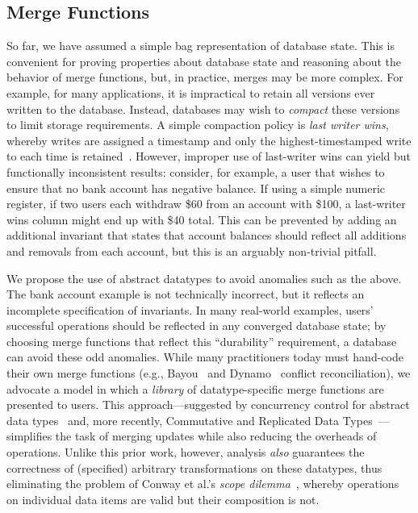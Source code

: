 \subsection{Merge Functions}
\label{sec:merge}

So far, we have assumed a simple bag representation of database
state. This is convenient for proving properties about database state
and reasoning about the behavior of merge functions, but, in practice,
merges may be more complex. For example, for many applications, it is
impractical to retain all versions ever written to the
database. Instead, databases may wish to \textit{compact} these
versions to limit storage requirements. A simple compaction policy is
\textit{last writer wins}, whereby writes are assigned a timestamp and
only the highest-timestamped write to each time is
retained~\cite{dynamo}. However, improper use of last-writer wins can
yield \iconfluent but functionally inconsistent results: consider, for
example, a user that wishes to ensure that no bank account has
negative balance. If using a simple numeric register, if two users
each withdraw \$60 from an account with \$100, a last-writer wins
column might end up with \$40 total. This can be prevented by adding
an additional invariant that states that account balances should
reflect all additions and removals from each account, but this is an
arguably non-trivial pitfall.

We propose the use of abstract datatypes to avoid anomalies such as
the above. The bank account example is not technically incorrect, but
it reflects an incomplete specification of invariants. In many
real-world examples, users' successful operations should be reflected
in any converged database state; by choosing merge functions that
reflect this ``durability'' requirement, a database can avoid these
odd anomalies. While many practitioners today must hand-code their own
merge functions (e.g., Bayou~\cite{bayou} and Dynamo~\cite{dynamo}
conflict reconciliation), we advocate a model in which a
\textit{library} of datatype-specific merge functions are presented to
users. This approach---suggested by concurrency control for abstract
data types~\cite{weihl-thesis} and, more recently, Commutative and
Replicated Data Types~\cite{crdt}---simplifies the task of merging
updates while also reducing the overheads of operations. Unlike this
prior work, however, \iconfluence analysis \textit{also} guarantees
the correctness of (specified) arbitrary transformations on these
datatypes, thus eliminating the problem of Conway et al.'s
\textit{scope dilemma}~\cite{blooml}, whereby operations on individual
data items are valid but their composition is not.




